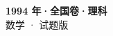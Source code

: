 \documentclass[zihao=-4, a4paper]{ctexart}
\begin{document}
\begin{center}
  {\Large\bfseries 1994 年·全国卷·理科}\\[4pt]
  {\large 数学 · 试题版}
\end{center}
\medskip
{}

\end{document}
